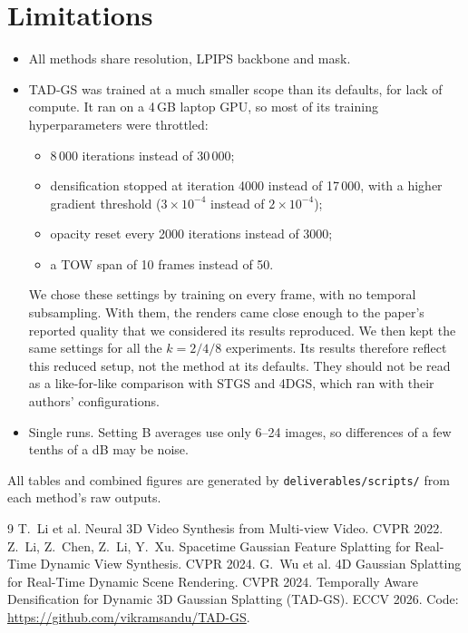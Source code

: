 \documentclass[10pt,a4paper]{article}
\begin{document}
\section{Limitations}
\begin{itemize}
\item All methods share resolution, LPIPS backbone and mask.
\item TAD-GS was trained at a much smaller scope than its defaults, for lack of compute. It ran on a 4\,GB laptop GPU, so most of its training hyperparameters were throttled:
\begin{itemize}
\item 8\,000 iterations instead of 30\,000;
\item densification stopped at iteration 4000 instead of 17\,000, with a higher gradient threshold ($3\times10^{-4}$ instead of $2\times10^{-4}$);
\item opacity reset every 2000 iterations instead of 3000;
\item a TOW span of 10 frames instead of 50.
\end{itemize}
We chose these settings by training on every frame, with no temporal subsampling. With them, the renders came close enough to the paper's reported quality that we considered its results reproduced. We then kept the same settings for all the $k=2/4/8$ experiments. Its results therefore reflect this reduced setup, not the method at its defaults. They should not be read as a like-for-like comparison with STGS and 4DGS, which ran with their authors' configurations.
\item Single runs. Setting B averages use only 6--24 images, so differences of a few tenths of a dB may be noise.
\end{itemize}
All tables and combined figures are generated by \texttt{deliverables/scripts/} from each method's raw outputs.

\begin{thebibliography}{9}\small
{} T.~Li et al. Neural 3D Video Synthesis from Multi-view Video. CVPR 2022.
 Z.~Li, Z.~Chen, Z.~Li, Y.~Xu. Spacetime Gaussian Feature Splatting for Real-Time Dynamic View Synthesis. CVPR 2024.
 G.~Wu et al. 4D Gaussian Splatting for Real-Time Dynamic Scene Rendering. CVPR 2024.
 Temporally Aware Densification for Dynamic 3D Gaussian Splatting (TAD-GS). ECCV 2026. Code: \url{https://github.com/vikramsandu/TAD-GS}.
\end{thebibliography}
\end{document}
